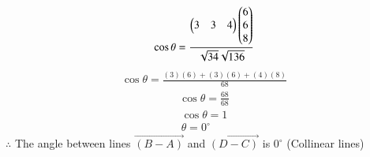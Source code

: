 \documentclass[journal,12pt,onecolumn]{IEEEtran}
\begin{document}
\begin{align}
    \cos{\theta}=\frac{\begin{pmatrix}3 & 3 & 4\end{pmatrix}\begin{pmatrix}6\\6\\8\end{pmatrix}}{\sqrt{34}\sqrt{136}}
\end{align}
\begin{align}
    \cos{\theta}=\frac{(3)(6)+(3)(6)+(4)(8)}{68}
\end{align}
\begin{align}
    \cos{\theta}=\frac{68}{68}
\end{align}
\begin{align}
    \cos{\theta}=1\\
    \theta=0^\circ
\end{align}
$\therefore$ The angle between lines $\vec{(B-A)}$ and $\vec{(D-C)}$ is $0^\circ$ (Collinear lines)
\end{document}
